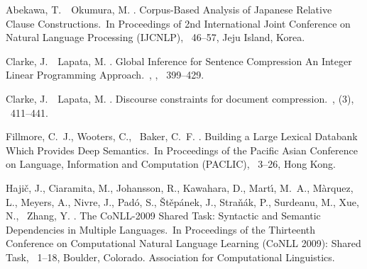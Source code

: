 \documentclass[japanese]{jnlp_1.4}
\begin{document}

{\addtolength{\baselineskip}{-1pt}
\begin{thebibliography}{}

Abekawa, T.\BBACOMMA\ \BBA\ Okumura, M. \BBCP.
\newblock \BBOQ Corpus-Based Analysis of Japanese Relative Clause
  Constructions.\BBCQ\
\newblock In {\Bem Proceedings of 2nd International Joint Conference on Natural
  Language Processing (IJCNLP)}, \mbox{\BPGS\ 46--57}, Jeju Island, Korea.

Clarke, J.\BBACOMMA\ \BBA\ Lapata, M. \BBCP.
\newblock \BBOQ Global Inference for Sentence Compression An Integer Linear
  Programming Approach.\BBCQ\
, {},
  \mbox{\BPGS\ 399--429}.

Clarke, J.\BBACOMMA\ \BBA\ Lapata, M. \BBOP 2010\BBCP.
\newblock \BBOQ Discourse constraints for document compression.\BBCQ\
, {}  (3), \mbox{\BPGS\
  411--441}.

Fillmore, C.~J., Wooters, C., \BBA\ Baker, C.~F. \BBCP.
\newblock \BBOQ Building a Large Lexical Databank Which Provides Deep
  Semantics.\BBCQ\
\newblock In {\Bem Proceedings of the Pacific Asian Conference on Language,
  Information and Computation (PACLIC)}, \mbox{\BPGS\ 3--26}, Hong Kong.

Haji\v{c}, J., Ciaramita, M., Johansson, R., Kawahara, D., Mart\'{\i}, M.~A.,
  M\`{a}rquez, L., Meyers, A., Nivre, J., Pad\'{o}, S., \v{S}t\v{e}p\'{a}nek,
  J., Stra\v{n}\'{a}k, P., Surdeanu, M., Xue, N., \BBA\ Zhang, Y. \BBOP
  2009\BBCP.
\newblock \BBOQ The CoNLL-2009 Shared Task: Syntactic and Semantic Dependencies
  in Multiple Languages.\BBCQ\
\newblock In {\Bem Proceedings of the Thirteenth Conference on Computational
  Natural Language Learning (CoNLL 2009): Shared Task}, \mbox{\BPGS\ 1--18},
  Boulder, Colorado. Association for Computational Linguistics.


\end{thebibliography}}
\end{document}
